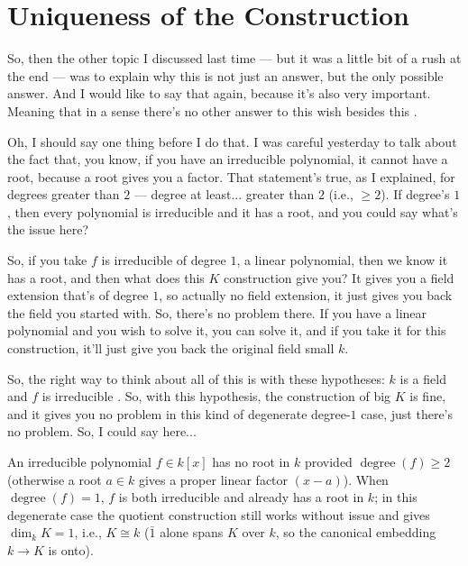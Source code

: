 \section{Uniqueness of the Construction}

\begin{speech}[00:09:46 - 00:11:42]
So, then the other topic I discussed last time --- but it was a little bit of a rush at the end --- was to explain why this is not just an answer, but the only possible answer. And I would like to say that again, because it's also very important. Meaning that in a sense there's no other answer to this wish besides this .

Oh, I should say one thing before I do that. I was careful yesterday to talk about the fact that, you know, if you have an irreducible polynomial, it cannot have a root, because a root gives you a factor. That statement's true, as I explained, for degrees greater than $2$ --- degree at least... greater than $2$ (i.e., $\ge 2$). If degree's $1$, then every polynomial is irreducible and it has a root, and you could say what's the issue here?

So, if you take $f$ is irreducible of degree $1$, a linear polynomial, then we know it has a root, and then what does this $K$ construction give you? It gives you a field extension that's of degree $1$, so actually no field extension, it just gives you back the field you started with. So, there's no problem there. If you have a linear polynomial and you wish to solve it, you can solve it, and if you take it for this construction, it'll just give you back the original field small $k$.

So, the right way to think about all of this is with these hypotheses: $k$ is a field and $f$ is irreducible . So, with this hypothesis, the construction of big $K$ is fine, and it gives you no problem in this kind of degenerate degree-$1$ case, just there's no problem. So, I could say here...
\end{speech}

\begin{insight}
An irreducible polynomial $f \in k[x]$ has no root in $k$ provided $\operatorname{degree}(f) \ge 2$ (otherwise a root $a \in k$ gives a proper linear factor $(x - a)$). When $\operatorname{degree}(f) = 1$, $f$ is both irreducible and already has a root in $k$; in this degenerate case the quotient construction still works without issue and gives $\dim_k K = 1$, i.e., $K \cong k$ ($\bar{1}$ alone spans $K$ over $k$, so the canonical embedding $k \to K$ is onto).
\end{insight}


